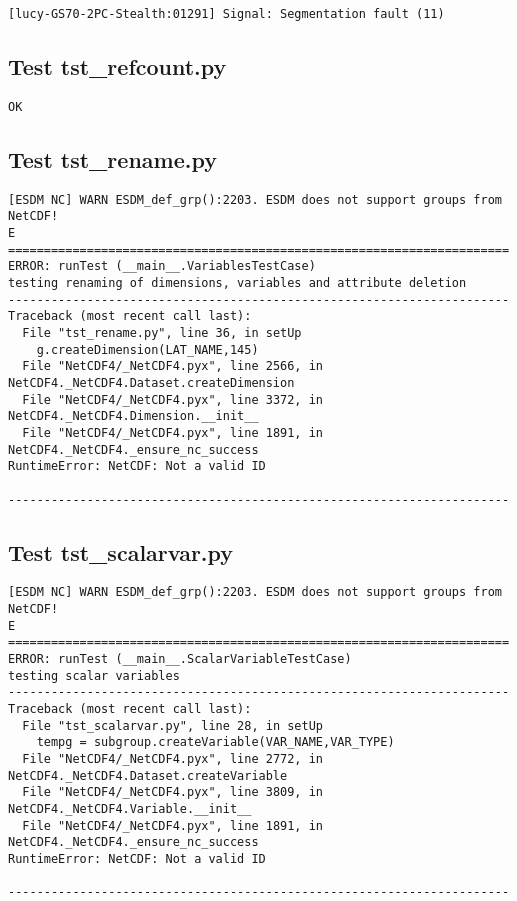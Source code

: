 \begin{verbatim}
[lucy-GS70-2PC-Stealth:01291] Signal: Segmentation fault (11)
\end{verbatim}

\subsection{Test tst\_refcount.py}

\begin{verbatim}
OK
\end{verbatim}

\subsection{Test tst\_rename.py}

\begin{verbatim}
[ESDM NC] WARN ESDM_def_grp():2203. ESDM does not support groups from NetCDF!
E
======================================================================
ERROR: runTest (__main__.VariablesTestCase)
testing renaming of dimensions, variables and attribute deletion
----------------------------------------------------------------------
Traceback (most recent call last):
  File "tst_rename.py", line 36, in setUp
    g.createDimension(LAT_NAME,145)
  File "NetCDF4/_NetCDF4.pyx", line 2566, in NetCDF4._NetCDF4.Dataset.createDimension
  File "NetCDF4/_NetCDF4.pyx", line 3372, in NetCDF4._NetCDF4.Dimension.__init__
  File "NetCDF4/_NetCDF4.pyx", line 1891, in NetCDF4._NetCDF4._ensure_nc_success
RuntimeError: NetCDF: Not a valid ID

----------------------------------------------------------------------
\end{verbatim}

\subsection{Test tst\_scalarvar.py}

\begin{verbatim}
[ESDM NC] WARN ESDM_def_grp():2203. ESDM does not support groups from NetCDF!
E
======================================================================
ERROR: runTest (__main__.ScalarVariableTestCase)
testing scalar variables
----------------------------------------------------------------------
Traceback (most recent call last):
  File "tst_scalarvar.py", line 28, in setUp
    tempg = subgroup.createVariable(VAR_NAME,VAR_TYPE)
  File "NetCDF4/_NetCDF4.pyx", line 2772, in NetCDF4._NetCDF4.Dataset.createVariable
  File "NetCDF4/_NetCDF4.pyx", line 3809, in NetCDF4._NetCDF4.Variable.__init__
  File "NetCDF4/_NetCDF4.pyx", line 1891, in NetCDF4._NetCDF4._ensure_nc_success
RuntimeError: NetCDF: Not a valid ID

----------------------------------------------------------------------
\end{verbatim}

